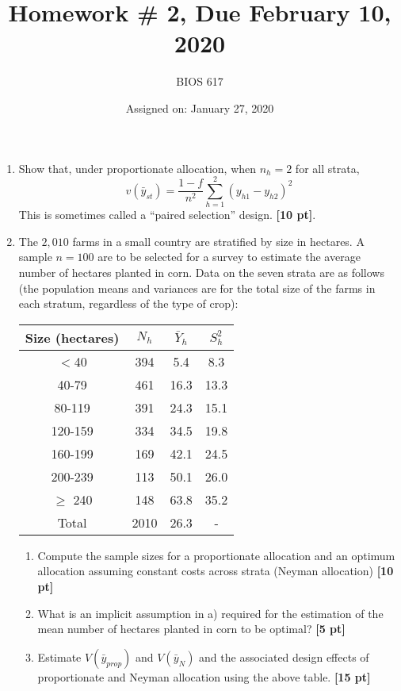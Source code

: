 \documentclass[12pt]{article}
\begin{document}
\title{Homework \# 2, Due February 10, 2020}
\author{BIOS 617}
\date{Assigned on: January 27, 2020}

\maketitle

\begin{enumerate}
\setlength{\itemsep}{15pt}%
\setlength{\parskip}{15pt}%

\item  Show that, under proportionate allocation, when $n_h = 2$ for all strata,
$$
v( \bar y_{st} ) = \frac{1-f}{n^2} \sum_{h=1}^2 ( y_{h1} - y_{h2} )^2
$$
This is sometimes called a ``paired selection'' design.  {\bf [10 pt]}.

\item The $2,010$ farms in a small country are stratified by size in hectares. A sample $n = 100$ are to be selected for a survey to estimate the average number of hectares planted in corn. Data on the seven strata are as follows (the population means and variances are for the total size of the farms in each stratum, regardless of the type of crop):

\begin{table}[!th]
\centering
\begin{tabular}{c c c c}
Size (hectares) & $N_h$ & $\bar Y_h$ & $S_h^2$ \\ \hline
$<$40 & 394 & 5.4 & 8.3 \\
40-79 & 461 & 16.3 & 13.3 \\
80-119 & 391 & 24.3 & 15.1 \\
120-159 & 334 & 34.5 & 19.8 \\
160-199 & 169 & 42.1 & 24.5 \\
200-239 & 113 & 50.1 & 26.0 \\
$\geq$ 240 & 148 & 63.8 & 35.2 \\
Total & 2010 & 26.3 & - \\ \hline
\end{tabular}
\end{table}

	\begin{enumerate}
		\item Compute the sample sizes for a proportionate allocation and an optimum allocation assuming constant costs across strata (Neyman allocation) {\bf [10 pt]}
		\item What is an implicit assumption in a) required for the estimation of the mean number of hectares planted in corn to be optimal? {\bf [5 pt]}
		\item Estimate $V(\bar y_{prop} )$ and $V( \bar y_N )$ and the associated design effects of proportionate and Neyman allocation using the above table. {\bf [15 pt]}
	\end{enumerate}


\end{enumerate}
\end{document}
